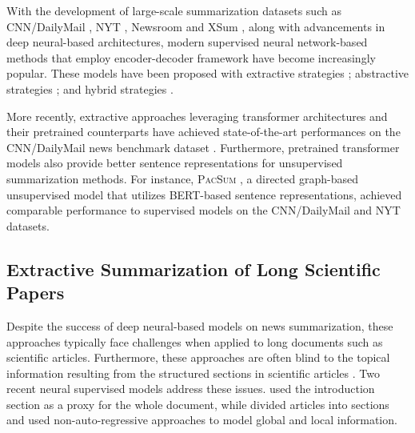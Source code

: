 \documentclass[11pt,a4paper]{article}
\begin{document}
With the development of large-scale summarization datasets such as CNN/DailyMail \citep{hermann2015teaching}, NYT \citep{sandhaus2008new}, Newsroom \citep{grusky2018newsroom} and XSum \citep{narayan2018don}, along with advancements in deep neural-based architectures, modern supervised neural network-based methods that employ encoder-decoder framework have become increasingly popular. These models have been proposed with extractive strategies \citep{cheng-lapata-2016-neural,nallapati2017summarunner,wu2018learning,dong2018banditsum,zhou2018neural,narayan2018ranking}; abstractive strategies \citep{see2017get,chen2018fast,gehrmann2018bottom, dong2019unified,zhang2019pegasus,lewis2019bart}; and hybrid strategies \citep{hsu-etal-2018-unified, bae2019summary,moroshko2019editorial}.

More recently, extractive approaches leveraging transformer architectures \citep{vaswani2017attention} and their pretrained counterparts \citep{devlin2019bert,lewis2019bart,zhang2019pegasus,dong2019unified} have achieved state-of-the-art performances on the CNN/DailyMail news benchmark dataset \citep{zhang2019hibert,liu2019text,zhong2019searching}. Furthermore, pretrained transformer models also provide better sentence representations for unsupervised summarization methods. For instance, \textsc{PacSum} \citep{zheng2019sentence}, a directed graph-based unsupervised model that utilizes BERT-based sentence representations, achieved comparable performance to supervised models on the CNN/DailyMail and NYT datasets.  

\subsection{Extractive Summarization of Long Scientific Papers}
Despite the success of deep neural-based models on news summarization, these approaches typically face challenges when applied to long documents such as scientific articles. Furthermore, these approaches are often blind to the topical information resulting from the structured sections in scientific articles \citep{xiao2019extractive}. Two recent neural supervised models address these issues. \citet{subramanian2019extractive} used the introduction section as a proxy for the whole document, while \citet{xiao2019extractive} divided articles into sections and used non-auto-regressive approaches to model global and local information. 
\end{document}
